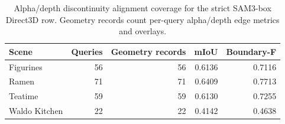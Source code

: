 \begin{table}[t]
\centering
\caption{Alpha/depth discontinuity alignment coverage for the strict SAM3-box Direct3D row. Geometry records count per-query alpha/depth edge metrics and overlays.}
\label{tab:alpha_depth_boundary_alignment}
\begin{tabular}{lrrrr}
\toprule
Scene & Queries & Geometry records & mIoU & Boundary-F \\
\midrule
Figurines & 56 & 56 & 0.6136 & 0.7116 \\
Ramen & 71 & 71 & 0.6409 & 0.7713 \\
Teatime & 59 & 59 & 0.6130 & 0.7255 \\
Waldo Kitchen & 22 & 22 & 0.4142 & 0.4638 \\
\bottomrule
\end{tabular}
\end{table}
